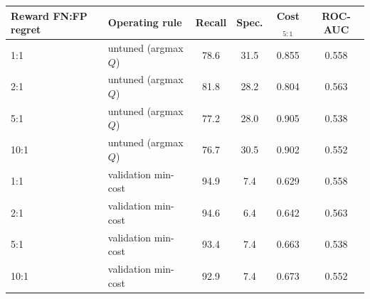 \begin{tabular}{llcccc}
\toprule
Reward FN:FP regret & Operating rule & Recall & Spec. & Cost$_{5:1}$ & ROC-AUC \\
\midrule
1:1 & untuned (argmax $Q$) & 78.6 & 31.5 & 0.855 & 0.558 \\
2:1 & untuned (argmax $Q$) & 81.8 & 28.2 & 0.804 & 0.563 \\
5:1 & untuned (argmax $Q$) & 77.2 & 28.0 & 0.905 & 0.538 \\
10:1 & untuned (argmax $Q$) & 76.7 & 30.5 & 0.902 & 0.552 \\
\midrule
1:1 & validation min-cost & 94.9 & 7.4 & 0.629 & 0.558 \\
2:1 & validation min-cost & 94.6 & 6.4 & 0.642 & 0.563 \\
5:1 & validation min-cost & 93.4 & 7.4 & 0.663 & 0.538 \\
10:1 & validation min-cost & 92.9 & 7.4 & 0.673 & 0.552 \\
\bottomrule
\end{tabular}
